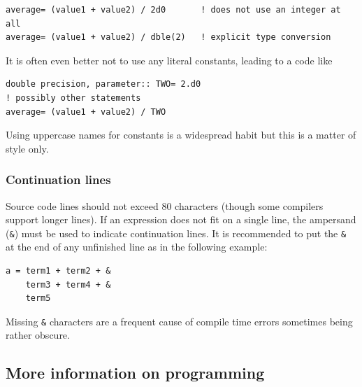 \documentclass[times,onecolumn]{article}
\begin{document}
\begin{shaded}
\begin{small}
\begin{verbatim}
average= (value1 + value2) / 2d0       ! does not use an integer at all
average= (value1 + value2) / dble(2)   ! explicit type conversion
\end{verbatim}
\end{small}
\end{shaded}

It is often even better not to use any literal constants, leading to a code like

\begin{shaded}
\begin{small}
\begin{verbatim}
double precision, parameter:: TWO= 2.d0
! possibly other statements
average= (value1 + value2) / TWO
\end{verbatim}
\end{small}
\end{shaded}

Using uppercase names for constants is a widespread habit but this is a matter of style only.

\subsubsection{Continuation lines}

Source code lines should not exceed 80 characters (though some  compilers support longer lines). If an expression does not fit on a single line, the ampersand (\verb|&|) must be used to indicate continuation lines. It is recommended to put the \verb|&| at the end of any unfinished line as in the following example:

\begin{shaded}
\begin{small}
\begin{verbatim}
a = term1 + term2 + &
    term3 + term4 + &
    term5
\end{verbatim}
\end{small}
\end{shaded}

Missing \verb|&| characters are a frequent cause of compile time errors sometimes being rather obscure.

\subsection{More information on  programming}
\end{document}
